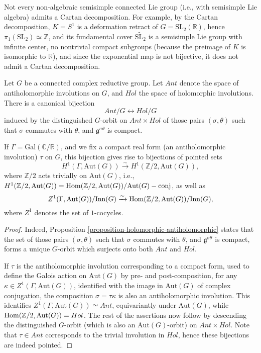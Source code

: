 \begin{remark}
 \label{remark-no-Cartan}
Not every non-algebraic semisimple connected Lie group (i.e., with semisimple Lie algebra) admits a Cartan decomposition. For example, by the Cartan decomposition, $K=S^1$ is a deformation retract of $G=\text{SL}_2(\mathbb R)$, hence $\pi_1(\text{SL}_2) \simeq \mathbb Z$, and its fundamental cover $\widetilde{\text{SL}_2}$ is a semisimple Lie group with infinite center, no nontrivial compact subgroups (because the preimage of $K$ is isomorphic to $\mathbb R$), and since the exponential map is not bijective, it does not admit a Cartan decomposition. 
\end{remark}



\begin{theorem}
\label{theorem-holomorphic-antiholomorphic}
Let $G$ be a connected complex reductive group. Let $Ant$ denote the space of antiholomorphic involutions on $G$, and $Hol$ the space of holomorphic involutions. There is a canonical bijection 
$$Ant/G \leftrightarrow Hol/G$$
induced by the distinguished $G$-orbit on $Ant \times Hol$ of those pairs $(\sigma,\theta)$ such that $\sigma$ commutes with $\theta$, and $\mathfrak g^{\sigma\theta}$ is compact.

If $\Gamma =\text{Gal}(\mathbb C/\mathbb R)$, and we fix a compact real form (an antiholomorphic involution) $\tau$ on $G$, this bijection gives rise to bijections of pointed sets
$$H^1(\Gamma, \text{Aut}(G)) \xrightarrow\sim H^1(\mathbb Z/2, \text{Aut}(G)),$$
where $\mathbb Z/2$ acts trivially on $\text{Aut}(G)$, i.e., \\ $H^1(\mathbb Z/2, \text{Aut}(G)) = \mathop{\rm Hom}\nolimits(\mathbb Z/2, \text{Aut}(G))/\text{Aut}(G)-\text{conj}$, as well as
$$Z^1(\Gamma, \text{Aut}(G))/\text{Inn}(G) \xrightarrow\sim \mathop{\rm Hom}\nolimits(\mathbb Z/2, \text{Aut}(G))/\text{Inn}(G),$$
where $Z^1$ denotes the set of $1$-cocycles.
\end{theorem}

\begin{proof}
 Indeed, Proposition \ref{proposition-holomorphic-antiholomorphic} states that the set of those pairs $(\sigma,\theta)$ such that $\sigma$ commutes with $\theta$, and $\mathfrak g^{\sigma\theta}$ is compact, forms a unique $G$-orbit which surjects onto both $Ant$ and $Hol$. 
 
 If $\tau$ is the antiholomorphic involution corresponding to a compact form, used to define the Galois action on $\text{Aut}(G)$ by pre- and post-composition, for any $\kappa \in Z^1(\Gamma, \text{Aut}(G))$, identified with the image in $\text{Aut}(G)$ of complex conjugation, the composition $\sigma = \tau\kappa$ is also an antiholomorphic involution. This identifies $Z^1(\Gamma, \text{Aut}(G)) \simeq Ant$, equivariantly under $\text{Aut}(G)$, while $\mathop{\rm Hom}\nolimits(\mathbb Z/2, \text{Aut}(G)) = Hol$. The rest of the assertions now follow by descending the distinguished $G$-orbit (which is also an $\text{Aut}(G)$-orbit) on $Ant \times Hol$. Note that $\tau \in Ant$ corresponds to the trivial involution in $Hol$, hence these bijections are indeed pointed.
\end{proof}

